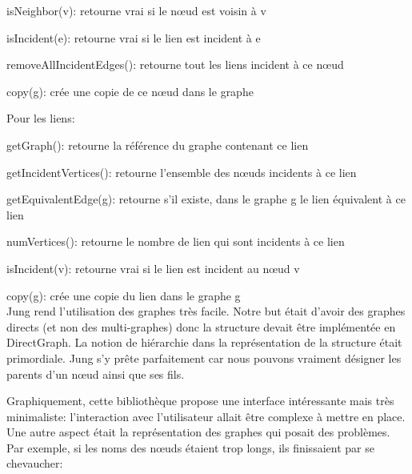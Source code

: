 \documentclass[french]{article}
\begin{document}
        isNeighbor(v): retourne vrai si le nœud est voisin à v

        isIncident(e): retourne vrai si le lien est incident à e

        removeAllIncidentEdges(): retourne tout les liens incident à ce nœud

        copy(g): crée une copie de ce nœud dans le graphe

      Pour les liens:

        getGraph(): retourne la référence du graphe contenant ce lien

        getIncidentVertices(): retourne l'ensemble des nœuds incidents à ce lien

        getEquivalentEdge(g): retourne s'il existe, dans le graphe g le lien équivalent à ce lien

        numVertices(): retourne le nombre de lien qui sont incidents à ce lien

        isIncident(v): retourne vrai si le lien est incident au nœud v

        copy(g): crée une copie du lien dans le graphe g\\
        
        


     Jung rend l'utilisation des graphes très facile. Notre but était d'avoir
     des graphes directs (et non des multi-graphes) donc la structure devait être
     implémentée en DirectGraph.
     La notion de hiérarchie dans la représentation de la structure était primordiale.
     Jung s'y prête parfaitement car nous pouvons vraiment désigner les parents d'un
     nœud ainsi que ses fils.

 \begin{figure}[h!]
     	\centering
     	\caption{}
    \end{figure}



     Graphiquement, cette bibliothèque propose une interface intéressante
     mais très minimaliste: l’interaction avec l'utilisateur  allait être complexe
     à mettre en place. Une autre aspect était la représentation des graphes qui 
     posait des problèmes. Par exemple, si les noms des nœuds
     étaient trop longs, ils finissaient par se chevaucher:

 	\begin{figure}[h!]
     	\centering
     	\caption{}
    \end{figure}
\end{document}
